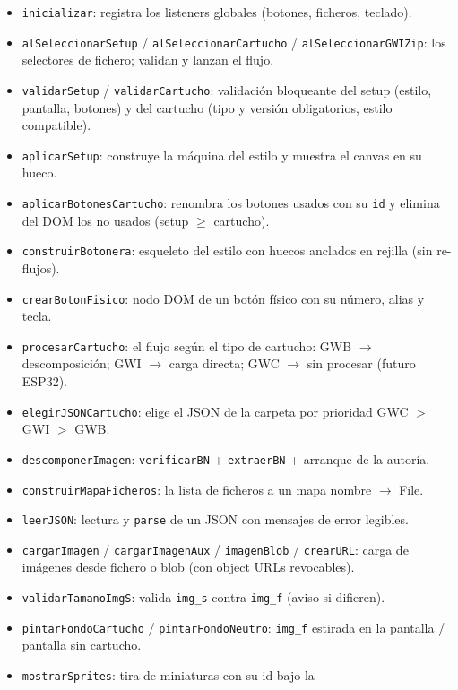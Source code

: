 \documentclass[../main.tex]{subfiles}
\begin{document}
\begin{itemize}
	\item \texttt{inicializar}: registra los listeners globales
	(botones, ficheros, teclado).
	\item \texttt{alSeleccionarSetup} / \texttt{alSeleccionarCartucho}
	/ \texttt{alSeleccionarGWIZip}: los selectores de fichero; validan
	y lanzan el flujo.
	\item \texttt{validarSetup} / \texttt{validarCartucho}: validación
	bloqueante del setup (estilo, pantalla, botones) y del cartucho
	(tipo y versión obligatorios, estilo compatible).
	\item \texttt{aplicarSetup}: construye la máquina del estilo y
	muestra el canvas en su hueco.
	\item \texttt{aplicarBotonesCartucho}: renombra los botones usados
	con su \texttt{id} y elimina del DOM los no usados
	(setup $\geq$ cartucho).
	\item \texttt{construirBotonera}: esqueleto del estilo con huecos
	anclados en rejilla (sin re-flujos).
	\item \texttt{crearBotonFisico}: nodo DOM de un botón físico con su
	número, alias y tecla.
	\item \texttt{procesarCartucho}: el flujo según el tipo de
	cartucho: GWB $\rightarrow$ descomposición; GWI $\rightarrow$ carga
	directa; GWC $\rightarrow$ sin procesar (futuro ESP32).
	\item \texttt{elegirJSONCartucho}: elige el JSON de la carpeta por
	prioridad GWC $>$ GWI $>$ GWB.
	\item \texttt{descomponerImagen}: \texttt{verificarBN} +
	\texttt{extraerBN} + arranque de la autoría.
	\item \texttt{construirMapaFicheros}: la lista de ficheros a un mapa
	nombre $\rightarrow$ File.
	\item \texttt{leerJSON}: lectura y \texttt{parse} de un JSON con
	mensajes de error legibles.
	\item \texttt{cargarImagen} / \texttt{cargarImagenAux} /
	\texttt{imagenBlob} / \texttt{crearURL}: carga de imágenes desde
	fichero o blob (con object URLs revocables).
	\item \texttt{validarTamanoImgS}: valida \texttt{img\_s} contra
	\texttt{img\_f} (aviso si difieren).
	\item \texttt{pintarFondoCartucho} / \texttt{pintarFondoNeutro}:
	\texttt{img\_f} estirada en la pantalla / pantalla sin cartucho.
	\item \texttt{mostrarSprites}: tira de miniaturas con su id bajo la

\end{itemize}
\end{document}
